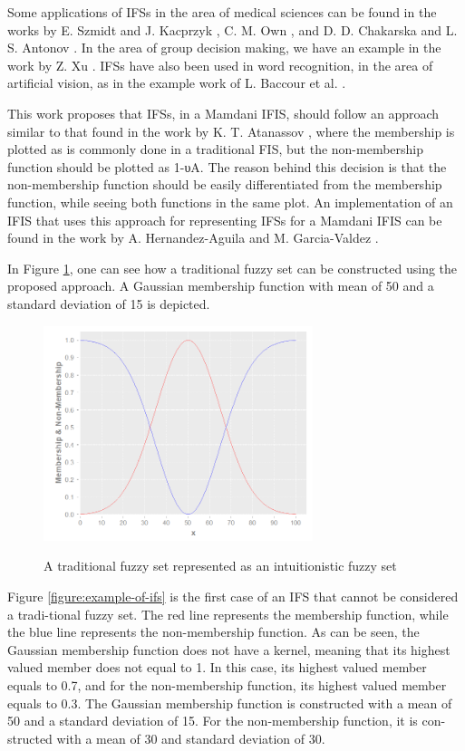 Some applications of IFSs in the area of medical sciences can be found in the
works by E. Szmidt and J. Kacprzyk \cite{Szmidt2001}, C. M. Own \cite{Own2009},
and D. D. Chakarska and L. S. Antonov \cite{Antonov1995}. In the area of group
decision making, we have an example in the work by Z. Xu \cite{Xu2007}. IFSs
have also been used in word recognition, in the area of artificial vision, as in
the example work of L. Baccour et al. \cite{Baccour2008}.

This work proposes that IFSs, in a Mamdani IFIS, should follow an approach
similar to that found in the work by K. T. Atanassov \cite{Atanassov2003}, where
the membership is plotted as is commonly done in a traditional FIS, but the
non-membership function should be plotted as 1-υA. The reason behind this
decision is that the non-membership function should be easily differentiated
from the membership function, while seeing both functions in the same plot. An
implementation of an IFIS that uses this approach for representing IFSs for a
Mamdani IFIS can be found in the work by A. Hernandez-Aguila and
M. Garcia-Valdez \cite{Hernandez-aguila}.

In Figure \ref{figure:traditional-set-as-ifs}, one can see how a traditional
fuzzy set can be constructed using the proposed approach. A Gaussian membership
function with mean of 50 and a standard deviation of 15 is depicted.

\begin{figure}
\caption{A traditional fuzzy set represented as an intuitionistic fuzzy set}
\centering
\includegraphics[width=0.7\textwidth]{img/traditional-set-as-ifs.png}
\label{figure:traditional-set-as-ifs}
\end{figure}

Figure \ref{figure:example-of-ifs} is the first case of an IFS that cannot be
considered a tradi-tional fuzzy set. The red line represents the membership
function, while the blue line represents the non-membership function. As can be
seen, the Gaussian membership function does not have a kernel, meaning that its
highest valued member does not equal to 1. In this case, its highest valued
member equals to 0.7, and for the non-membership function, its highest valued
member equals to 0.3. The Gaussian membership function is constructed with a
mean of 50 and a standard deviation of 15. For the non-membership function, it
is con-structed with a mean of 30 and standard deviation of 30.

